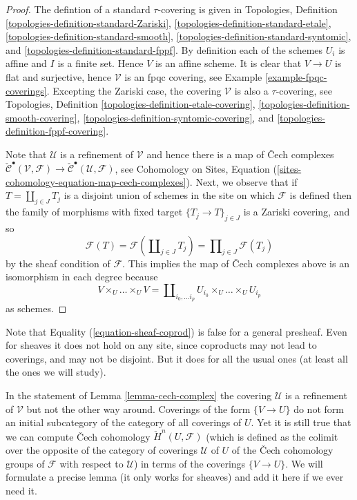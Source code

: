 \begin{proof}
The defintion of a standard $\tau$-covering is given in
Topologies, Definition
\ref{topologies-definition-standard-Zariski},
\ref{topologies-definition-standard-etale},
\ref{topologies-definition-standard-smooth},
\ref{topologies-definition-standard-syntomic}, and
\ref{topologies-definition-standard-fppf}.
By definition each of the schemes
$U_i$ is affine and $I$ is a finite set. Hence $V$ is an affine scheme.
It is clear that $V \to U$ is flat and surjective, hence
$\mathcal{V}$ is an fpqc covering, see
Example \ref{example-fpqc-coverings}.
Excepting the Zariski case, the covering $\mathcal{V}$
is also a $\tau$-covering, see
Topologies, Definition
\ref{topologies-definition-etale-covering},
\ref{topologies-definition-smooth-covering},
\ref{topologies-definition-syntomic-covering}, and
\ref{topologies-definition-fppf-covering}.

\medskip\noindent
Note that $\mathcal{U}$ is a refinement of $\mathcal{V}$
and hence there is a map of {\v C}ech complexes
$\check{\mathcal{C}}^\bullet (\mathcal{V}, \mathcal{F}) \to
\check{\mathcal{C}}^\bullet (\mathcal{U}, \mathcal{F})$, see
Cohomology on Sites,
Equation (\ref{sites-cohomology-equation-map-cech-complexes}).
Next, we observe that if $T = \coprod_{j \in J} T_j$ is a
disjoint union of schemes in the site on which $\mathcal{F}$ is defined
then the family of morphisms with fixed target
$\{T_j \to T\}_{j \in J}$ is a Zariski covering, and so
\begin{equation}
\label{equation-sheaf-coprod}
\mathcal{F}(T) =
\mathcal{F}(\coprod\nolimits_{j \in J} T_j) =
\prod\nolimits_{j \in J} \mathcal{F}(T_j)
\end{equation}
by the sheaf condition of $\mathcal{F}$.
This implies the map of {\v C}ech complexes above is an isomorphism
in each degree because
$$
V \times_U \ldots \times_U V
=
\coprod\nolimits_{i_0, \ldots i_p} U_{i_0} \times_U \ldots \times_U U_{i_p}
$$
as schemes.
\end{proof}

\noindent
Note that Equality (\ref{equation-sheaf-coprod})
is false for a general presheaf. Even for sheaves it does not hold on any
site, since coproducts may not lead to coverings, and may not be disjoint.
But it does for all the usual ones (at least all the ones we will study).

\begin{remark}
\label{remark-refinement}
In the statement of Lemma \ref{lemma-cech-complex} the covering $\mathcal{U}$
is a refinement of $\mathcal{V}$ but not the other way around. Coverings
of the form $\{V \to U\}$ do not form an initial subcategory of the
category of all coverings of $U$. Yet it is still true that
we can compute {\v C}ech cohomology $\check H^n(U, \mathcal{F})$ (which
is defined as the colimit over the opposite of the category of
coverings $\mathcal{U}$ of $U$ of the {\v C}ech cohomology groups of
$\mathcal{F}$ with respect to $\mathcal{U}$) in terms of the coverings
$\{V \to U\}$. We will formulate a precise lemma (it only works for sheaves)
and add it here if we ever need it.
\end{remark}

